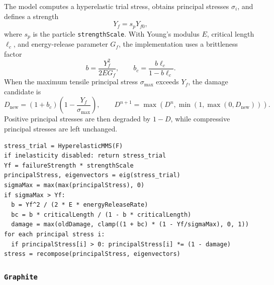 The model computes a hyperelastic trial stress, obtains principal stresses \(\sigma_i\), and defines a strength
\begin{equation}
  Y_f = s_p Y_{f0},
\end{equation}
where \(s_p\) is the particle \texttt{strengthScale}.  With Young's modulus \(E\), critical length \(\ell_c\), and energy-release parameter \(G_f\), the implementation uses a brittleness factor
\begin{equation}
  b = \frac{Y_f^2}{2 E G_f},
  \qquad
  b_c = \frac{b\ell_c}{1-b\ell_c}.
  \label{eq:chiumenti-brittleness}
\end{equation}
When the maximum tensile principal stress \(\sigma_{\max}\) exceeds \(Y_f\), the damage candidate is
\begin{equation}
  D_{\mathrm{new}}
  = (1+b_c)\left(1-\frac{Y_f}{\sigma_{\max}}\right),
  \qquad
  D^{n+1}=\max\left(D^n,\min(1,\max(0,D_{\mathrm{new}}))\right).
  \label{eq:chiumenti-damage}
\end{equation}
Positive principal stresses are then degraded by \(1-D\), while compressive principal stresses are left unchanged.

\begin{lstlisting}[caption={Chiumenti tensile-damage update.},label={alg:chiumenti-update},basicstyle=\ttfamily\small]
stress_trial = HyperelasticMMS(F)
if inelasticity disabled: return stress_trial
Yf = failureStrength * strengthScale
principalStress, eigenvectors = eig(stress_trial)
sigmaMax = max(max(principalStress), 0)
if sigmaMax > Yf:
  b = Yf^2 / (2 * E * energyReleaseRate)
  bc = b * criticalLength / (1 - b * criticalLength)
  damage = max(oldDamage, clamp((1 + bc) * (1 - Yf/sigmaMax), 0, 1))
for each principal stress i:
  if principalStress[i] > 0: principalStress[i] *= (1 - damage)
stress = recompose(principalStress, eigenvectors)
\end{lstlisting}
\subsubsection{\texttt{Graphite}}
\label{subsubsec:graphite-model}

